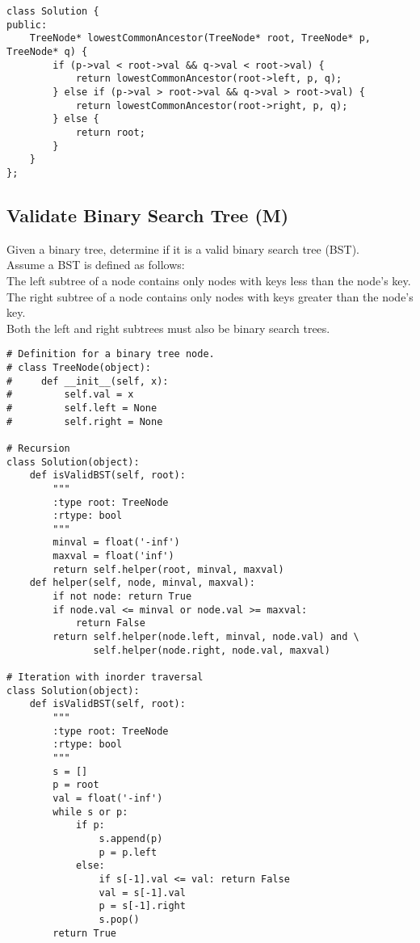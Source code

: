 \begin{lstlisting}
class Solution {
public:
    TreeNode* lowestCommonAncestor(TreeNode* root, TreeNode* p, TreeNode* q) {
        if (p->val < root->val && q->val < root->val) {
            return lowestCommonAncestor(root->left, p, q);
        } else if (p->val > root->val && q->val > root->val) {
            return lowestCommonAncestor(root->right, p, q);
        } else {
            return root;
        }     
    }
};
\end{lstlisting}


\subsection{Validate Binary Search Tree (M)}
Given a binary tree, determine if it is a valid binary search tree (BST).\\

Assume a BST is defined as follows:\\
    The left subtree of a node contains only nodes with keys less than the node's key.\\
    The right subtree of a node contains only nodes with keys greater than the node's key.\\
    Both the left and right subtrees must also be binary search trees.\\

\begin{lstlisting}
# Definition for a binary tree node.
# class TreeNode(object):
#     def __init__(self, x):
#         self.val = x
#         self.left = None
#         self.right = None

# Recursion
class Solution(object):
    def isValidBST(self, root):
        """
        :type root: TreeNode
        :rtype: bool
        """
        minval = float('-inf')
        maxval = float('inf')
        return self.helper(root, minval, maxval)
    def helper(self, node, minval, maxval):
        if not node: return True
        if node.val <= minval or node.val >= maxval:
            return False
        return self.helper(node.left, minval, node.val) and \
               self.helper(node.right, node.val, maxval)
        
# Iteration with inorder traversal
class Solution(object):
    def isValidBST(self, root):
        """
        :type root: TreeNode
        :rtype: bool
        """
        s = []
        p = root
        val = float('-inf')
        while s or p:
            if p:
                s.append(p)
                p = p.left
            else:
                if s[-1].val <= val: return False
                val = s[-1].val
                p = s[-1].right
                s.pop()
        return True
\end{lstlisting}

